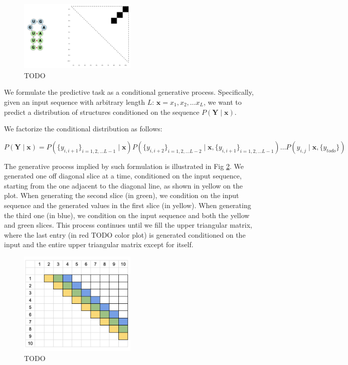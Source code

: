 \documentclass{article}
\begin{document}
\begin{figure}[h!]
    \centering
    \includegraphics[width=0.5\textwidth]{plot/rna_ss_binary_mat.png}
    \caption{TODO}
    \label{fig:rna_ss_binary_mat}
    \centering
\end{figure}

We formulate the predictive task as a conditional generative process.
Specifically, given an input sequence with arbitrary length $L$: $\bm{x} = x_1, x_2, \dots x_{L}$,
we want to predict a distribution of structures conditioned on the sequence $P(\bm{Y} \mid \bm{x})$.


We factorize the conditional distribution as follows:

$$
P(\bm{Y} \mid \bm{x}) = P(\{y_{i, i+1}\}_{i=1, 2, \dots L-1} \mid \bm{x})
P(\{y_{i, i+2}\}_{i=1, 2, \dots L-2} \mid \bm{x}, \{y_{i, i+1}\}_{i=1, 2, \dots L-1})
\dots
P(y_{i, j} \mid \bm{x}, \{y_{todo}\})
$$

The generative process implied by such formulation is illustrated in Fig \ref{fig:autoregressive_direction}.
We generated one off diagonal slice at a time, conditioned on the input sequence,
starting from the one adjacent to the diagonal line, as shown in yellow on the plot.
When generating the second slice (in green), we condition on the input sequence and the generated values in the first slice (in yellow).
When generating the third one (in blue), we condition on the input sequence and both the yellow and green slices.
This process continues until we fill the upper triangular matrix,
where the last entry (in red TODO color plot) is generated conditioned on the input and the entire upper triangular matrix except for itself.

\begin{figure}[h!]
    \centering
    \includegraphics[width=0.5\textwidth]{plot/autoregressive_direction.png}
    \caption{TODO}
    \label{fig:autoregressive_direction}
    \centering
\end{figure}
\end{document}
